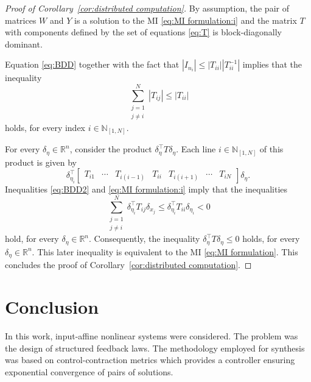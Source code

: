 \documentclass[10pt,twocolumn,twoside]{IEEEtran}
\theoremstyle{plain}
\theoremstyle{definition}
\theoremstyle{remark}
\begin{document}
\begin{proof}[Proof of Corollary~\ref{cor:distributed computation}]
	By assumption, the pair of matrices $W$ and $Y$ is a solution to the MI \eqref{eq:MI formulation:i} and the matrix $T$ with components defined by the set of equations \eqref{eq:T} is block-diagonally dominant.
	
	Equation \eqref{eq:BDD} together with the fact that $|I_{n_i}|\leq |T_{ii}||T_{ii}^{-1}|$ implies that the inequality
	\begin{equation}\label{eq:BDD2} 
		\sum_{\substack{j=1\\ j\neq i}}^N|T_{ij}|\leq |T_{ii}|
	\end{equation}
	holds, for every index $i\in\mathbb{N}_{[1,N]}$.
	
	For every $\delta_\eta\in\mathbb{R}^n$, consider the product $\delta_\eta^\top T\delta_\eta$. Each line $i\in\mathbb{N}_{[1,N]}$ of this product is given by
	\begin{equation*}
		\delta_{\eta_i}^\top\begin{bmatrix}
			T_{i1}&\cdots&T_{i(i-1)}&T_{ii}&T_{i(i+1)}&\cdots&T_{iN}
		\end{bmatrix}\delta_\eta.
	\end{equation*}
	Inequalities \eqref{eq:BDD2} and \eqref{eq:MI formulation:i} imply that the inequalities
	\begin{equation*}
		\sum_{\substack{j=1\\ j\neq i}}^N\delta_{\eta_i}^\top T_{ij}\delta_{x_j}\leq \delta_{\eta_i}^\top T_{ii}\delta_{\eta_i}< 0
	\end{equation*}
	hold, for every $\delta_\eta\in\mathbb{R}^n$. Consequently, the inequality $\delta_\eta^\top T\delta_\eta\leq 0$ holds, for every $\delta_\eta\in\mathbb{R}^n$. This later inequality is equivalent to the MI \eqref{eq:MI formulation}. This concludes the proof of Corollary~\ref{cor:distributed computation}.
\end{proof}


\section{Conclusion}\label{sec:Conclusion}

In this work, input-affine nonlinear systems were considered. The problem was the design of structured feedback laws. The methodology employed for synthesis was based on control-contraction metrics which provides a controller ensuring exponential convergence of pairs of solutions.
\end{document}
